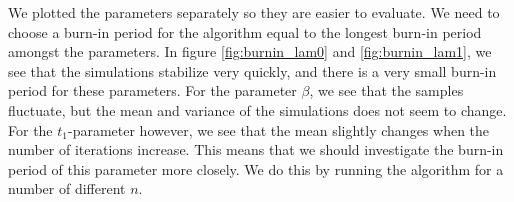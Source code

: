 We plotted the parameters separately so they are easier to evaluate. We need to choose a burn-in period for the algorithm equal to the longest burn-in period amongst the parameters. 
In figure \ref{fig:burnin_lam0} and \ref{fig:burnin_lam1}, we see that the simulations stabilize very quickly, and there is a very small burn-in period for these parameters. 
For the parameter $\beta$, we see that the samples fluctuate, but the mean and variance of the simulations does not seem to change. For the $t_1$-parameter however, we see that the mean slightly changes when the number of iterations increase. This means that we should investigate the burn-in period of this parameter more closely. We do this by running the algorithm for a number of different $n$. 




